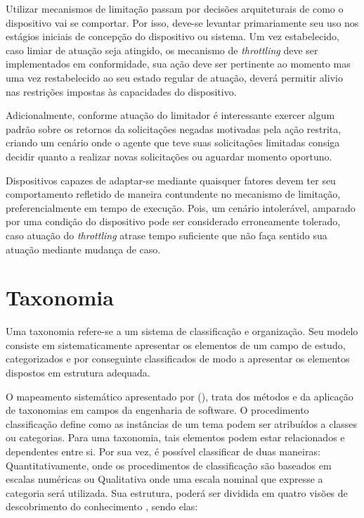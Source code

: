 Utilizar mecanismos de limitação passam por decisões arquiteturais de como o dispositivo vai se comportar. Por isso, deve-se levantar primariamente seu uso nos estágios iniciais de concepção do dispositivo ou sistema. Um vez estabelecido, caso limiar de atuação seja atingido, os mecanismo de \textit{throttling} deve ser implementados em conformidade, sua ação deve ser pertinente ao momento mas uma vez restabelecido ao seu estado regular de atuação, deverá permitir alivio nas restrições impostas às capacidades do dispositivo.

Adicionalmente, conforme atuação do limitador é interessante exercer algum padrão sobre os retornos da solicitações negadas motivadas pela ação restrita, criando um cenário onde o agente que teve suas solicitações limitadas consiga decidir quanto a realizar novas solicitações ou aguardar momento oportuno.

Dispositivos capazes de adaptar-se mediante quaisquer fatores devem ter seu comportamento refletido de maneira contundente no mecanismo de limitação, preferencialmente em tempo de execução. Pois, um cenário intolerável, amparado por uma condição do dispositivo pode ser considerado erroneamente tolerado, caso atuação do \textit{throttling} atrase tempo suficiente que não faça sentido sua atuação mediante mudança de caso.

\section{Taxonomia}
\label{cap2:taxonomia}

Uma taxonomia refere-se a um sistema de classificação e organização. Seu modelo consiste em sistematicamente apresentar os elementos de um campo de estudo, categorizados e por conseguinte classificados de modo a apresentar os elementos dispostos em estrutura adequada.

O mapeamento sistemático apresentado por \citeauthor{usman_taxonomies_2017} (\citeyear{usman_taxonomies_2017}), trata dos métodos e da aplicação de taxonomias em campos da engenharia de software. O procedimento classificação define como as instâncias de um tema podem ser atribuídos a classes ou categorias. Para uma taxonomia, tais elementos podem estar relacionados e dependentes entre si. Por sua vez, é possível classificar de duas maneiras: Quantitativamente, onde os procedimentos de classificação são baseados em escalas numéricas ou Qualitativa onde uma escala nominal que expresse a categoria será utilizada. Sua estrutura, poderá ser dividida em quatro visões de descobrimento do conhecimento \cite{kwasnik_role_nodate}, sendo elas:

